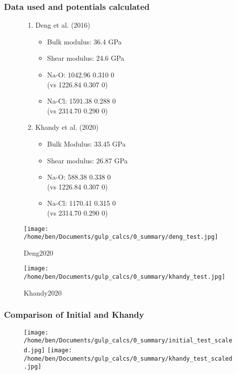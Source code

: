 \documentclass{beamer}
\begin{document}
\begin{frame}
\frametitle{Data used and potentials calculated}

\begin{figure}
  \begin{minipage}{0.505\linewidth}
    \centering
      \begin{enumerate}
        \item Deng et al. (2016)
        \begin{itemize}
          \item Bulk modulus: 36.4 GPa
          \item Shear modulus: 24.6 GPa
          \item Na-O: 1042.96 0.310 0 \\ (vs 1226.84 0.307 0)
          \item Na-Cl:  1591.38 0.288 0 \\ (vs 2314.70 0.290 0)
        \end{itemize}
        \bigskip
        \item Khandy et al. (2020)
        \begin{itemize}
          \item Bulk Modulus: 33.45 GPa
          \item Shear modulus: 26.87 GPa
          \item Na-O: 588.38 0.338 0 \\ (vs 1226.84 0.307 0)
          \item Na-Cl: 1170.41 0.315 0 \\ (vs 2314.70 0.290 0)
        \end{itemize}
      \end{enumerate}
  \end{minipage}
  \hspace{0.5cm}
  \begin{minipage}{0.4\linewidth}
    \centering
    \texttt{[image: /home/ben/Documents/gulp\_calcs/0\_summary/deng\_test.jpg]}
    \caption{Deng2020}
    \texttt{[image: /home/ben/Documents/gulp\_calcs/0\_summary/khandy\_test.jpg]}
    \caption{Khandy2020}
  \end{minipage}
\end{figure}

\end{frame}

\begin{frame}
\frametitle{Comparison of Initial and Khandy}

\begin{figure}
\texttt{[image: /home/ben/Documents/gulp\_calcs/0\_summary/initial\_test\_scaled.jpg]}%
\texttt{[image: /home/ben/Documents/gulp\_calcs/0\_summary/khandy\_test\_scaled.jpg]}
\end{figure}

\end{frame}
\end{document}
